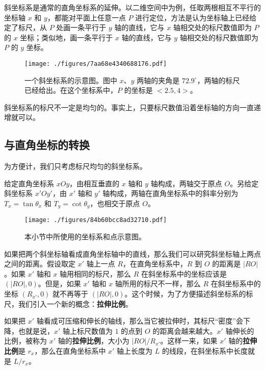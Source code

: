 

斜坐标系是通常的直角坐标系的延伸。以二维空间中为例，任取两根相互不平行的坐标轴 $x$ 和 $y$，都能对平面上任意一点 $P$ 进行定位，方法是认为坐标轴上已经给定了标尺，从 $P$ 处画一条平行于 $y$ 轴的直线，它与 $x$ 轴相交处的标尺数值即为 $P$ 的 $x$ 坐标；类似地，画一条平行于 $x$ 轴的直线，它与 $y$ 轴相交处的标尺数值即为 $P$ 的 $y$ 坐标。

\begin{figure}[ht]
\centering
\texttt{[image: ./figures/7aa68e4340688176.pdf]}
\caption{一个斜坐标系的示意图。图中 $x$、$y$ 两轴的夹角是 $72.9^\circ$，两轴的标尺已经给出。在这个坐标系中，$P$ 的坐标是 $<2.5, 4>$。} \label{fig_ObSys_1}
\end{figure}

斜坐标系的标尺不一定是均匀的。事实上，只要标尺数值沿着坐标轴的方向一直递增就可以。

\subsection{与直角坐标的转换}

为方便计，我们只考虑标尺均匀的斜坐标系。

给定直角坐标系 $xOy$，由相互垂直的 $x$ 轴和 $y$ 轴构成，两轴交于原点 $O$。另给定斜坐标系 $x'Oy'$，由 $x'$ 轴和 $y'$ 轴构成，两轴在直角坐标系中的斜率分别为 $T_x=\tan{\theta_x}$ 和 $T_y=\cot{\theta_y}$，也相交于原点 $O$。

\begin{figure}[ht]
\centering
\texttt{[image: ./figures/84b60bcc8ad32710.pdf]}
\caption{本小节中所使用的坐标系和点示意图。} \label{fig_ObSys_2}
\end{figure}

如果把两个斜坐标轴看成直角坐标轴中的直线，那么我们可以研究斜坐标轴上两点之间的距离。假设取定 $x'$ 轴上一点 $R$，在直角坐标系中，$R$ 到 $O$ 的距离是 $|RO|$。如果 $x'$ 轴和 $x$ 轴用相同的标尺，那么 $R$ 在斜坐标系中的坐标应该是 $(|RO|, 0)$。但是，如果 $x'$ 轴和 $x$ 轴所用的标尺不一样，那么 $R$ 在斜坐标系中的坐标 $(R_{x'},0)$ 就不再等于 $(|RO|, 0)$。这个时候，为了方便描述斜坐标系的标尺，我们引入一个新的概念：\textbf{拉伸比例}。

如果把 $x'$ 轴看成可压缩和伸长的轴线，那么当它被拉伸时，其标尺“密度”会下降，也就是说，$x'$ 轴上标尺数值为 $1$ 的点到 $O$ 的距离会越来越大。$x'$ 轴伸长的比例，被称为 $x'$ 轴的\textbf{拉伸比例}，大小为 $|RO|/R_{x'}$。这样一来，如果 $x'$ 轴的\textbf{拉伸比例}是 $r_x$，那么在直角坐标系中 $x'$ 轴上长度为 $L$ 的线段，在斜坐标系中长度就是 $L/r_x$。

